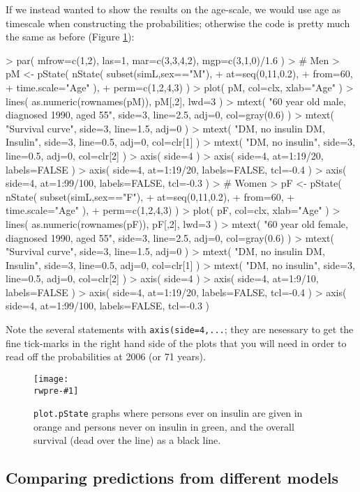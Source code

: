 \documentclass[a4paper,twoside,12pt]{report}
\newcommand{\rwpre}{sL}
\newcommand{\insfig}[3]{
\begin{figure}[h]
  \centering
  \texttt{[image: \\rwpre-\#1]}
  \caption{#3}
  \label{fig:#1}
\end{figure}}
\begin{document}
If we instead wanted to show the results on the age-scale, we would
use age as timescale when constructing the probabilities; otherwise the
code is pretty much the same as before (Figure \ref{fig:pstatey}):
\begin{Schunk}
\begin{Sinput}
> par( mfrow=c(1,2), las=1, mar=c(3,3,4,2), mgp=c(3,1,0)/1.6 )
> # Men
> pM <- pState( nState( subset(simL,sex=="M"),
+                       at=seq(0,11,0.2),
+                       from=60,
+                       time.scale="Age" ),
+               perm=c(1,2,4,3) )
> plot( pM, col=clx, xlab="Age" )
> lines( as.numeric(rownames(pM)), pM[,2], lwd=3 )
> mtext( "60 year old male, diagnosed 1990, aged 55", side=3, line=2.5, adj=0, col=gray(0.6) )
> mtext( "Survival curve", side=3, line=1.5, adj=0 )
> mtext( "DM, no insulin   DM, Insulin", side=3, line=0.5, adj=0, col=clr[1] )
> mtext( "DM, no insulin", side=3, line=0.5, adj=0, col=clr[2] )
> axis( side=4 )
> axis( side=4, at=1:19/20, labels=FALSE )
> axis( side=4, at=1:19/20, labels=FALSE, tcl=-0.4 )
> axis( side=4, at=1:99/100, labels=FALSE, tcl=-0.3 )
> # Women
> pF <- pState( nState( subset(simL,sex=="F"),
+                       at=seq(0,11,0.2),
+                       from=60,
+                       time.scale="Age" ),
+               perm=c(1,2,4,3) )
> plot( pF, col=clx, xlab="Age" )
> lines( as.numeric(rownames(pF)), pF[,2], lwd=3 )
> mtext( "60 year old female, diagnosed 1990, aged 55", side=3, line=2.5, adj=0, col=gray(0.6) )
> mtext( "Survival curve", side=3, line=1.5, adj=0 )
> mtext( "DM, no insulin   DM, Insulin", side=3, line=0.5, adj=0, col=clr[1] )
> mtext( "DM, no insulin", side=3, line=0.5, adj=0, col=clr[2] )
> axis( side=4 )
> axis( side=4, at=1:9/10, labels=FALSE )
> axis( side=4, at=1:19/20, labels=FALSE, tcl=-0.4 )
> axis( side=4, at=1:99/100, labels=FALSE, tcl=-0.3 )
\end{Sinput}
\end{Schunk}
Note the several statements with \texttt{axis(side=4,...}; they are
nesessary to get the fine tick-marks in the right hand side of the
plots that you will need in order to read off the probabilities at
2006 (or 71 years).

\insfig{pstatey}{1.0}{\textrm{\tt plot.pState} graphs where persons
  ever on insulin are given in orange and persons never on insulin in
  green, and the overall survival (dead over the line) as a black line.}

\subsection{Comparing predictions from different models}
\end{document}
